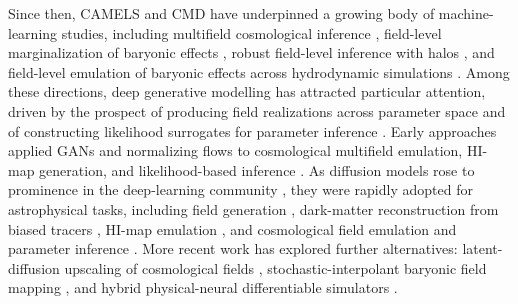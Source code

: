 \documentclass[usenatbib]{mnras}
\begin{document}
Since then, CAMELS and CMD have underpinned a growing body of
machine-learning studies, including multifield cosmological inference
\citep{Villaescusa2021MultifieldAI}, field-level marginalization of
baryonic effects \citep{Villaescusa2021FieldLevel}, robust field-level
inference with halos \citep{Shao2023}, and field-level emulation of
baryonic effects across hydrodynamic simulations
\citep{Sharma2024FieldLevel}.
Among these directions, deep generative modelling has attracted
particular attention, driven by the prospect of producing field
realizations across parameter space and of constructing likelihood
surrogates for parameter inference \citep{Mudur2024DiffHMC}.
Early approaches applied GANs \citep{Goodfellow2014} and normalizing
flows \citep{RezendeMohamed2015} to cosmological multifield emulation,
HI-map generation, and likelihood-based inference
\citep{Andrianomena2022,Andrianomena2024,Hassan2021HIFlow,Friedman2022HIGlow}.
As diffusion models rose to prominence in the deep-learning community
\citep{Ho2020,Song2021}, they were rapidly adopted for astrophysical
tasks, including field generation \citep{Mudur2022DDPM}, dark-matter
reconstruction from biased tracers
\citep{Park2023Diffusion,Ono2024Debiasing}, HI-map emulation
\citep{Hassan2023HIDM}, and cosmological field emulation and parameter
inference \citep{Mudur2024,Mudur2024DiffHMC}.
More recent work has explored further alternatives: latent-diffusion
upscaling of cosmological fields \citep{Mishra2026}, stochastic-interpolant
baryonic field mapping \citep{Horowitz2025}, and hybrid
physical-neural differentiable simulators \citep{Thomsen2025Hybrid}.
\end{document}

